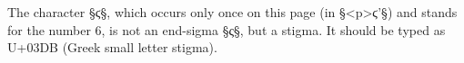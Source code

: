 
\begin{note}
The character §ϛ§, which occurs only once on this page (in §<p>ϛ'§) and stands for the number 6, is not an end-sigma §ς§, but a stigma. It should be typed as U+03DB (Greek small letter stigma).
\end{note}

